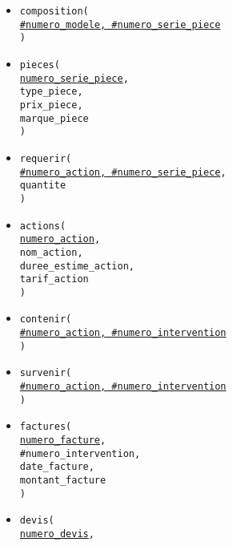\documentclass[a4paper,11pt]{article} %
\begin{document}
\begin{itemize}[leftmargin=*]
{        type\_modele, \\
        marque\_modele, \\
        version\_modele, \\
        annee\_modele \\
    )}
    \item \texttt{composition( \\
        \underline{\#numero\_modele, \#numero\_serie\_piece} \\
    )}
    \item \texttt{pieces( \\
        \underline{numero\_serie\_piece}, \\
        type\_piece, \\
        prix\_piece, \\
        marque\_piece \\
    )}
    \item \texttt{requerir( \\
        \underline{\#numero\_action, \#numero\_serie\_piece}, \\
        quantite \\
    )}
    \item \texttt{actions( \\
        \underline{numero\_action}, \\
        nom\_action, \\
        duree\_estime\_action, \\
        tarif\_action \\
    )}
    \item \texttt{contenir( \\
        \underline{\#numero\_action, \#numero\_intervention} \\
    )}
    \item \texttt{survenir( \\
        \underline{\#numero\_action, \#numero\_intervention} \\
    )}
    \item \texttt{factures( \\
        \underline{numero\_facture}, \\
        \#numero\_intervention, \\
        date\_facture, \\
        montant\_facture \\
    )}
    \item \texttt{devis( \\
        \underline{numero\_devis}, \\
}
\end{itemize}
\end{document}

